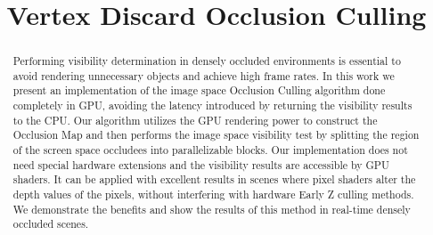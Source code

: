 \documentclass[10pt, conference]{IEEEtran}
\begin{document}
%
\title{Vertex Discard Occlusion Culling}

\newif\iffinal
\finaltrue
\newcommand{\jemsid}{99999}



\iffinal
  \author{%
  
  }
\else
  \author{Sibgrapi paper ID: \jemsid \\ }
\fi







\maketitle


\begin{abstract}
Performing visibility determination in densely occluded environments is essential to avoid rendering unnecessary objects and achieve high frame rates. 
In this work we present an implementation of the image space Occlusion Culling algorithm done completely in GPU, avoiding the latency introduced by returning 
the visibility results to the CPU. 
Our algorithm utilizes the GPU rendering power to construct the Occlusion Map and then performs the image space visibility test by splitting the region of 
the screen space occludees into parallelizable blocks. 
Our implementation does not need special hardware extensions and the visibility results are accessible by GPU shaders. It can be applied with excellent 
results in scenes where pixel shaders alter the depth values of the pixels, without interfering with hardware Early Z culling methods. 
We demonstrate the benefits and show the results of this method in real-time densely occluded scenes.
\end{abstract}
\end{document}
